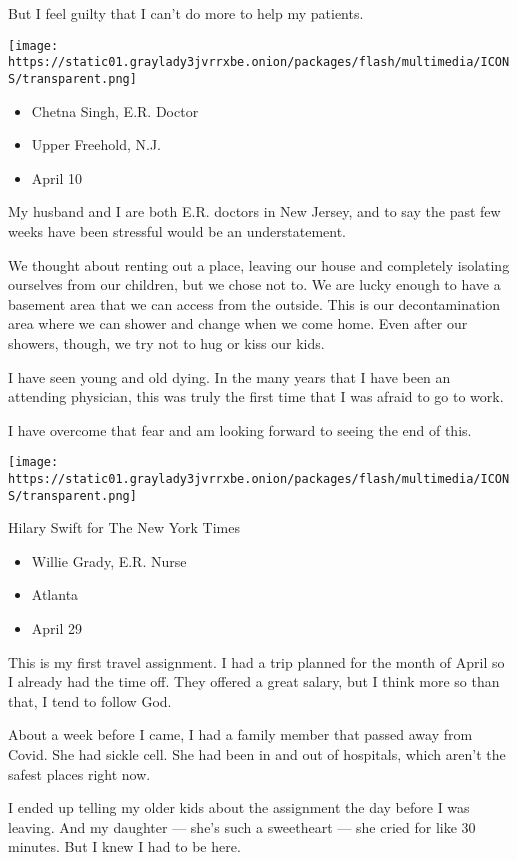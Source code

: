 But I feel guilty that I can't do more to help my patients.

\texttt{[image: https://static01.graylady3jvrrxbe.onion/packages/flash/multimedia/ICONS/transparent.png]}

\begin{itemize}
\tightlist
\item
  Chetna Singh, E.R. Doctor
\item
  Upper Freehold, N.J.
\item
  April 10
\end{itemize}

My husband and I are both E.R. doctors in New Jersey, and to say the
past few weeks have been stressful would be an understatement.

We thought about renting out a place, leaving our house and completely
isolating ourselves from our children, but we chose not to. We are lucky
enough to have a basement area that we can access from the outside. This
is our decontamination area where we can shower and change when we come
home. Even after our showers, though, we try not to hug or kiss our
kids.

I have seen young and old dying. In the many years that I have been an
attending physician, this was truly the first time that I was afraid to
go to work.

I have overcome that fear and am looking forward to seeing the end of
this.

\texttt{[image: https://static01.graylady3jvrrxbe.onion/packages/flash/multimedia/ICONS/transparent.png]}

Hilary Swift for The New York Times

\begin{itemize}
\tightlist
\item
  Willie Grady, E.R. Nurse
\item
  Atlanta
\item
  April 29
\end{itemize}

This is my first travel assignment. I had a trip planned for the month
of April so I already had the time off. They offered a great salary, but
I think more so than that, I tend to follow God.

About a week before I came, I had a family member that passed away from
Covid. She had sickle cell. She had been in and out of hospitals, which
aren't the safest places right now.

I ended up telling my older kids about the assignment the day before I
was leaving. And my daughter --- she's such a sweetheart --- she cried
for like 30 minutes. But I knew I had to be here.

